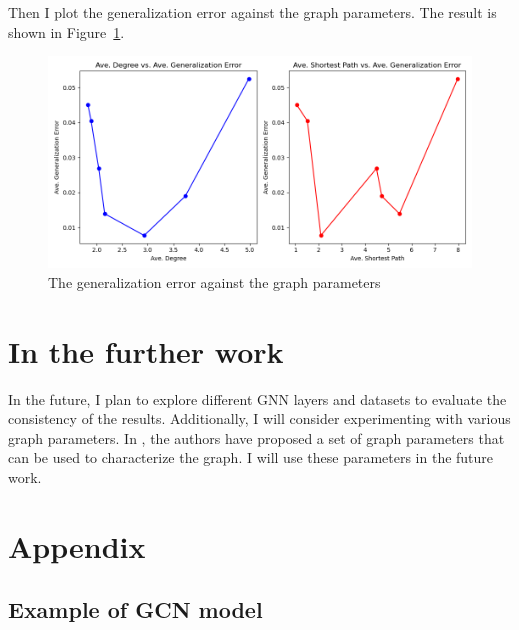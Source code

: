 \documentclass{article}
\begin{document}
Then I plot the generalization error against the graph parameters. The result is shown in Figure~\ref{fig:scatter}.

\begin{figure}[h!]
    \includegraphics[width=\textwidth]{final_results.png}
    \caption{The generalization error against the graph parameters}
    \label{fig:scatter}
\end{figure}

\section{In the further work}
In the future, I plan to explore different GNN layers and datasets to evaluate the consistency of the results. Additionally, I will consider experimenting with various graph parameters. In \cite{gera2018annotated}, the authors have proposed a set of graph parameters that can be used to characterize the graph. I will use these parameters in the future work.

\newpage


\newpage 

\section{Appendix} 
 
\subsection*{Example of GCN model}
\end{document}
